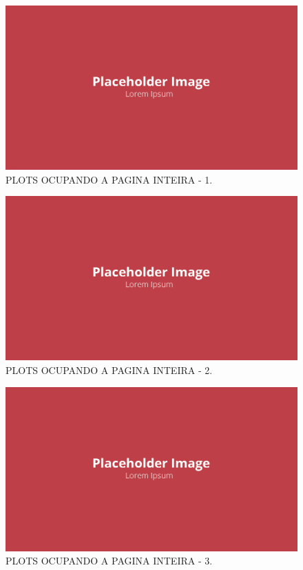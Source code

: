 \begin{figure}[!ht]
    \centering
    \includegraphics[width=.8\linewidth]{figuras/outras/placeholder.png}
    \caption{PLOTS OCUPANDO A PAGINA INTEIRA - 1\cite{autor}.}
    \label{fig:placeholder}
\end{figure}

\begin{figure}[!ht]
    \centering
    \includegraphics[width=.8\linewidth]{figuras/outras/placeholder.png}
    \caption{PLOTS OCUPANDO A PAGINA INTEIRA - 2\cite{autor}.}
    \label{fig:placeholder}
\end{figure}

\begin{figure}[!ht]
    \centering
    \includegraphics[width=.8\linewidth]{figuras/outras/placeholder.png}
    \caption{PLOTS OCUPANDO A PAGINA INTEIRA - 3\cite{autor}.}
    \label{fig:placeholder}
\end{figure}

